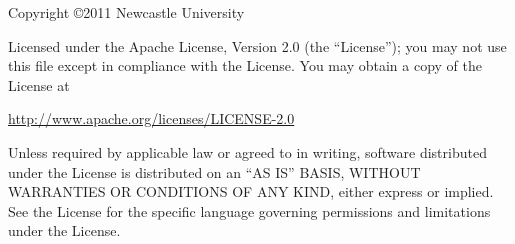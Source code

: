 %
%
%

\begin{licence}
  \begin{center}
    Copyright \copyright 2011 Newcastle University
  \end{center}

  \noindent Licensed under the Apache License, Version 2.0 (the ``License'');
  you may not use this file except in compliance with the License.  You may
  obtain a copy of the License at

  \begin{center}
    \url{http://www.apache.org/licenses/LICENSE-2.0}
  \end{center}

  \noindent Unless required by applicable law or agreed to in writing, software
  distributed under the License is distributed on an ``AS IS'' BASIS, WITHOUT
  WARRANTIES OR CONDITIONS OF ANY KIND, either express or implied.  See the
  License for the specific language governing permissions and limitations under
  the License.
\end{licence}
\thispagestyle{empty}
\cleardoublepage
